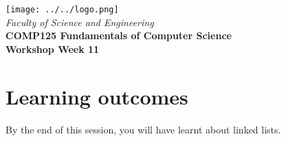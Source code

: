 \usepackage[T1]{fontenc}
\usepackage{pslatex}
 \usepackage[pdftex]{color}  
 \usepackage[pdftex]{graphicx}     
\usepackage{verbatim}
\usepackage{xcolor}
\usepackage{paralist}
\usepackage{tagging}

\usepackage[colorlinks=true,urlcolor=red]{hyperref}
\setlength{\topmargin}{-0.5in}                  %
\setlength{\textheight}{9.5in}                  %
\setlength{\oddsidemargin}{0in}                 %
\setlength{\evensidemargin}{0in}                %
\setlength{\textwidth}{6.5in}                   %
\setlength{\parindent}{0.0in}
\newcommand{\code}{\texttt}

\usepackage{listings}




%
\vspace{0.2in}
\begin{center}
        {\large  %
\texttt{[image: ../../logo.png]}\\
\medskip
        {\it  Faculty of Science and Engineering\\}
        \vspace{0.2in}
         {\bf COMP125 Fundamentals of Computer Science\\
        Workshop Week 11\\}}
\end{center}
\vspace{0.3in}
%

\renewcommand{\labelenumi}{\alph{enumi}.}
 
\section* {Learning outcomes}

By the end of this session, you will have learnt about linked lists. 


